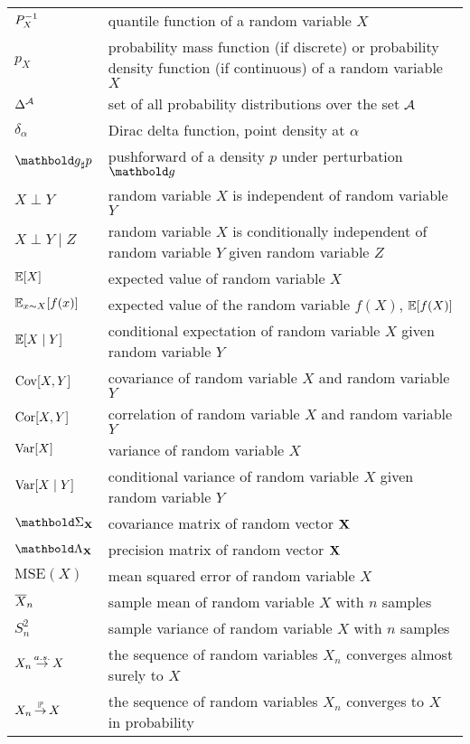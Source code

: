 \begin{longtable}{@{}p{2.5cm}l@{\extracolsep{\fill}}}
  $P^{-1}_X$ & quantile function of a random variable $X$ \\
  $p_X$ & \makecell[tl]{probability mass function (if discrete) or probability density function \\ (if continuous) of a random variable $X$} \\
  $\Delta^{\mathcal{A}}$ & set of all probability distributions over the set $\mathcal{A}$ \\
  $\delta_\alpha$ & Dirac delta function, point density at $\alpha$ \\
  $\pf{\vg}{p}$ & pushforward of a density $p$ under perturbation $\vg$ \\
  \addlinespace
  $X \perp Y$ & random variable $X$ is independent of random variable $Y$ \\
  $X \perp Y \mid Z$ & \makecell[tl]{random variable $X$ is conditionally independent of random variable $Y$ \\ given random variable $Z$} \\
  \addlinespace
  $\E{X}$ & expected value of random variable $X$ \\
  $\E[x \sim X]{f(x)}$ & expected value of the random variable $f(X)$, $\E{f(X)}$ \\
  $\E{X \mid Y}$ & conditional expectation of random variable $X$ given random variable $Y$ \\
  $\Cov{X,Y}$ & covariance of random variable $X$ and random variable $Y$ \\
  $\Cor{X,Y}$ & correlation of random variable $X$ and random variable $Y$ \\
  $\Var{X}$ & variance of random variable $X$ \\
  $\Var{X \mid Y}$ & conditional variance of random variable $X$ given random variable $Y$ \\
  $\mSigma_\rX$ & covariance matrix of random vector $\mathbf{X}$ \\
  $\mLambda_\rX$ & precision matrix of random vector $\mathbf{X}$ \\
  \addlinespace
  $\mathrm{MSE}(X)$ & mean squared error of random variable $X$ \\
  $\overline{X}_n$ & sample mean of random variable $X$ with $n$ samples \\
  $S_n^2$ & sample variance of random variable $X$ with $n$ samples \\
  \addlinespace
  $X_n \operatorname*{\smash{\overset{a.s.}{\rightarrow}}} X$ & the sequence of random variables $X_n$ converges almost surely to $X$ \\
  $X_n \operatorname*{\smash{\overset{\mathbb{P}}{\rightarrow}}} X$ & the sequence of random variables $X_n$ converges to $X$ in probability \\

\end{longtable}
